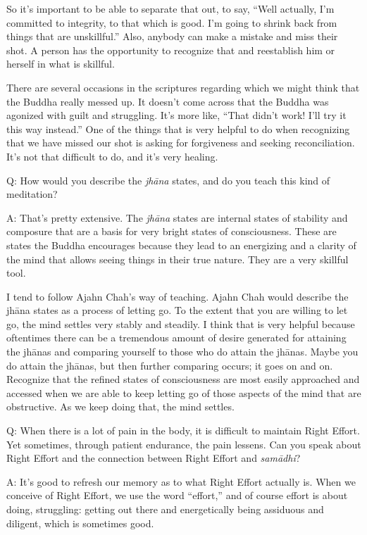 So it’s important to be able to separate that out, to say, “Well
actually, I’m committed to integrity, to that which is good. I’m going
to shrink back from things that are unskillful.” Also, anybody can make
a mistake and miss their shot. A person has the opportunity to recognize
that and reestablish him or herself in what is skillful.

There are several occasions in the scriptures regarding which we might
think that the Buddha really messed up. It doesn’t come across that the
Buddha was agonized with guilt and struggling. It’s more like, “That
didn’t work! I’ll try it this way instead.” One of the things that is
very helpful to do when recognizing that we have missed our shot is
asking for forgiveness and seeking reconciliation. It’s not that
difficult to do, and it’s very healing.

\vspace{\the\qaskip}
Q: How would you describe the \emph{jhāna} states, and do you teach this
kind of meditation?

\vspace{\the\qaskip}
A: That’s pretty extensive. The \emph{jhāna} states are internal states
of stability and composure that are a basis for very bright states of
consciousness. These are states the Buddha encourages because they lead
to an energizing and a clarity of the mind that allows seeing things in
their true nature. They are a very skillful tool.

I tend to follow Ajahn Chah’s way of teaching. Ajahn Chah would describe
the jhāna states as a process of letting go. To the extent that you are
willing to let go, the mind settles very stably and steadily. I think
that is very helpful because oftentimes there can be a tremendous amount
of desire generated for attaining the jhānas and comparing yourself to
those who do attain the jhānas. Maybe you do attain the jhānas, but then
further comparing occurs; it goes on and on. Recognize that the refined
states of consciousness are most easily approached and accessed when we
are able to keep letting go of those aspects of the mind that are
obstructive. As we keep doing that, the mind settles.

\vspace{\the\qaskip}
Q: When there is a lot of pain in the body, it is difficult to maintain
Right Effort. Yet sometimes, through patient endurance, the pain
lessens. Can you speak about Right Effort and the connection between
Right Effort and \emph{samādhi}?

\vspace{\the\qaskip}
A: It’s good to refresh our memory as to what Right Effort actually is.
When we conceive of Right Effort, we use the word “effort,” and of
course effort is about doing, struggling: getting out there and
energetically being assiduous and diligent, which is sometimes good.

